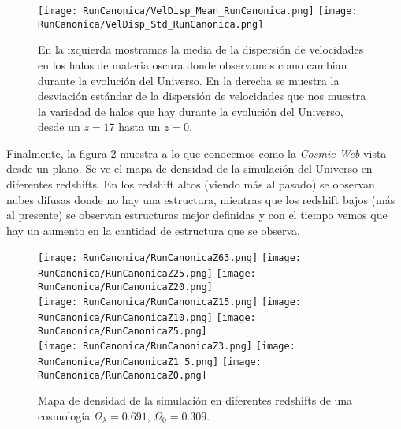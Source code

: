 \begin{figure}[H]
    \centering
    \texttt{[image: RunCanonica/VelDisp\_Mean\_RunCanonica.png]}
    \texttt{[image: RunCanonica/VelDisp\_Std\_RunCanonica.png]}
    \caption[Media y desviación estándar de la dispersión de velocidades]{\footnotesize En la izquierda mostramos la media de la dispersión de velocidades en los halos de materia oscura donde observamos como cambian durante la evolución del Universo. En la derecha se muestra la desviación estándar de la dispersión de velocidades que nos muestra la variedad de halos que hay durante la evolución del Universo, desde un $z=17$ hasta un $z=0$.}
    \label{fig:Canon-VelDispStats}
\end{figure}

Finalmente, la figura \ref{fig:CanonRunDensityMap} muestra a lo que conocemos como la \emph{Cosmic Web} vista desde un plano. Se ve el mapa de densidad de la simulación del Universo en diferentes redshifts. En los redshift altos (viendo más al pasado) se observan nubes difusas donde no hay una estructura, mientras que los redshift bajos (más al presente) se observan estructuras mejor definidas y con el tiempo vemos que hay un aumento en la cantidad de estructura que se observa.

\begin{figure}[H]
    \centering

    \texttt{[image: RunCanonica/RunCanonicaZ63.png]}   %
    \texttt{[image: RunCanonica/RunCanonicaZ25.png]}   %
    \texttt{[image: RunCanonica/RunCanonicaZ20.png]}   %
    \\
    \texttt{[image: RunCanonica/RunCanonicaZ15.png]}   %
    \texttt{[image: RunCanonica/RunCanonicaZ10.png]}   %
    \texttt{[image: RunCanonica/RunCanonicaZ5.png]}    %
    \\
    \texttt{[image: RunCanonica/RunCanonicaZ3.png]}    %
    \texttt{[image: RunCanonica/RunCanonicaZ1\_5.png]}  %
    \texttt{[image: RunCanonica/RunCanonicaZ0.png]}    %
    \caption[Mapa de densidad de un Universo en en diferentes redshift]{ \footnotesize Mapa de densidad de la simulación en diferentes redshifts de una cosmología $\Omega_\lambda = 0.691 $, $\Omega_0 = 0.309$. }
    \label{fig:CanonRunDensityMap}
\end{figure}

